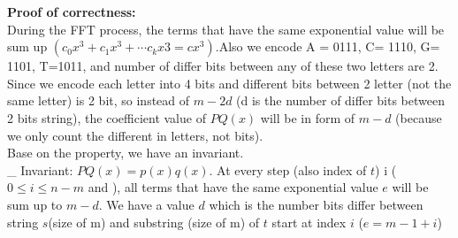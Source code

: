\documentclass[11pt]{article}
\newenvironment{qparts}{\begin{enumerate}[{(}a{)}]}{\end{enumerate}}
\begin{document}
\begin{qparts}
\noindent
\textbf{Proof of correctness:}\\
During the FFT process, the terms that have the same exponential value will be sum up $(c_0x^3 + c_1x^3 + \cdots c_kx3 = cx^3)$.Also we encode A = 0111, C= 1110, G= 1101, T=1011, and number of differ bits between any of these two letters are 2. Since we encode each letter into 4 bits and different bits between 2 letter (not the same letter) is 2 bit, so instead of $m-2d$ (d is the number of differ bits between 2 bits string), the coefficient value of $PQ(x)$ will be in form of $m-d$ (because we only count the different in letters, not bits).\\
Base on the property, we have an invariant. \\
\_ Invariant:
$PQ(x) = p(x)q(x) $. At every step (also index of $t$) i  ($0 \leqslant i \leqslant n-m $ and ), all terms that have the same exponential value $e$ will be sum up to $m-d$. We have a value $d $ which is the number bits differ between string $s$(size of m) and substring (size of m) of $t$ start at index $i$ ($e = m-1+i$)


\end{qparts}
\end{document}
